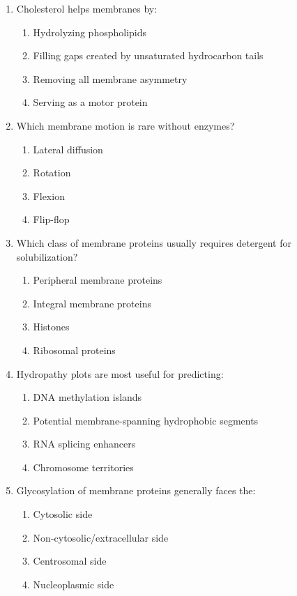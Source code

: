 \documentclass[12pt,fontset=none]{ctexart}
\begin{document}
\begin{enumerate}
\item Cholesterol helps membranes by:
\begin{enumerate}[label=\alph*.]
\item Hydrolyzing phospholipids
\item Filling gaps created by unsaturated hydrocarbon tails
\item Removing all membrane asymmetry
\item Serving as a motor protein
\end{enumerate}

\item Which membrane motion is rare without enzymes?
\begin{enumerate}[label=\alph*.]
\item Lateral diffusion
\item Rotation
\item Flexion
\item Flip-flop
\end{enumerate}

\item Which class of membrane proteins usually requires detergent for solubilization?
\begin{enumerate}[label=\alph*.]
\item Peripheral membrane proteins
\item Integral membrane proteins
\item Histones
\item Ribosomal proteins
\end{enumerate}

\item Hydropathy plots are most useful for predicting:
\begin{enumerate}[label=\alph*.]
\item DNA methylation islands
\item Potential membrane-spanning hydrophobic segments
\item RNA splicing enhancers
\item Chromosome territories
\end{enumerate}

\item Glycosylation of membrane proteins generally faces the:
\begin{enumerate}[label=\alph*.]
\item Cytosolic side
\item Non-cytosolic/extracellular side
\item Centrosomal side
\item Nucleoplasmic side
\end{enumerate}


\end{enumerate}
\end{document}
